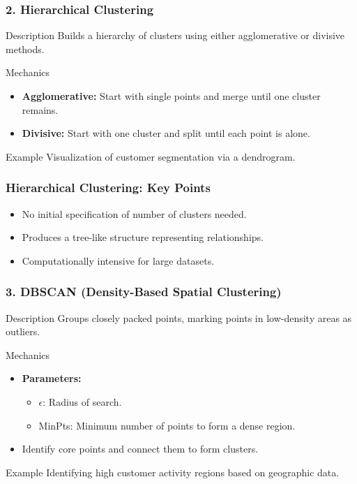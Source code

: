 \documentclass[aspectratio=169]{beamer}
\begin{document}
\begin{frame}[fragile]
  \frametitle{2. Hierarchical Clustering}
  \begin{block}{Description}
    Builds a hierarchy of clusters using either agglomerative or divisive methods.
  \end{block}
  
  \begin{block}{Mechanics}
    \begin{itemize}
      \item \textbf{Agglomerative:} Start with single points and merge until one cluster remains.
      \item \textbf{Divisive:} Start with one cluster and split until each point is alone.
    \end{itemize}
  \end{block}
  
  \begin{block}{Example}
    Visualization of customer segmentation via a dendrogram.
  \end{block}
\end{frame}

\begin{frame}[fragile]
  \frametitle{Hierarchical Clustering: Key Points}
  \begin{itemize}
    \item No initial specification of number of clusters needed.
    \item Produces a tree-like structure representing relationships.
    \item Computationally intensive for large datasets.
  \end{itemize}
\end{frame}

\begin{frame}[fragile]
  \frametitle{3. DBSCAN (Density-Based Spatial Clustering)}
  \begin{block}{Description}
    Groups closely packed points, marking points in low-density areas as outliers.
  \end{block}
  
  \begin{block}{Mechanics}
    \begin{itemize}
      \item \textbf{Parameters:}
      \begin{itemize}
        \item $\epsilon$: Radius of search.
        \item MinPts: Minimum number of points to form a dense region.
      \end{itemize}
      \item Identify core points and connect them to form clusters.
    \end{itemize}
  \end{block}
  
  \begin{block}{Example}
    Identifying high customer activity regions based on geographic data.
  \end{block}
\end{frame}
\end{document}

